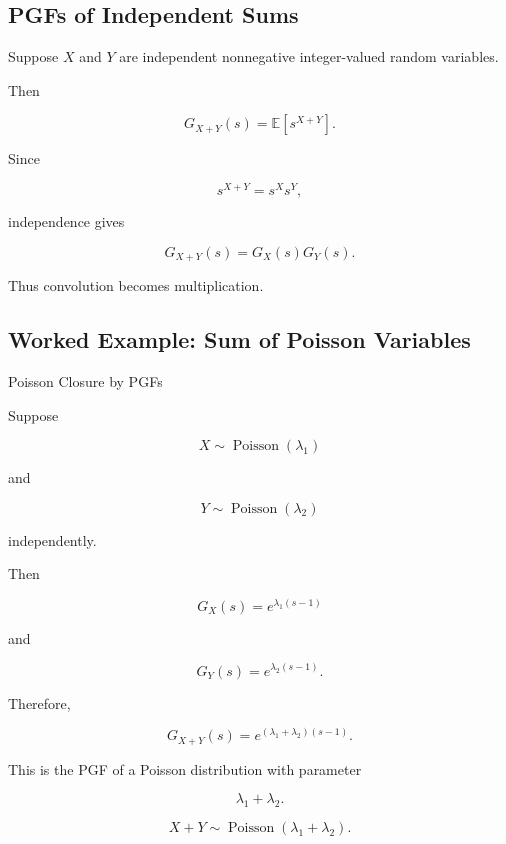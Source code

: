 \subsection{PGFs of Independent Sums}
\label{subsec:pgf-independent-sums}

Suppose \(X\) and \(Y\) are independent nonnegative integer-valued
random variables.

Then

\[
G_{X+Y}(s)
=
\mathbb{E}[s^{X+Y}].
\]

Since

\[
s^{X+Y}
=
s^Xs^Y,
\]

independence gives

\[
\boxed{
G_{X+Y}(s)
=
G_X(s)G_Y(s).
}
\]

Thus convolution becomes multiplication.

\subsection{Worked Example: Sum of Poisson Variables}
\label{subsec:worked-pgf-poisson-sum}

\begin{workedexamplebox}{Poisson Closure by PGFs}

Suppose

\[
X\sim\operatorname{Poisson}(\lambda_1)
\]

and

\[
Y\sim\operatorname{Poisson}(\lambda_2)
\]

independently.

Then

\[
G_X(s)
=
e^{\lambda_1(s-1)}
\]

and

\[
G_Y(s)
=
e^{\lambda_2(s-1)}.
\]

Therefore,

\[
G_{X+Y}(s)
=
e^{(\lambda_1+\lambda_2)(s-1)}.
\]

This is the PGF of a Poisson distribution with parameter

\[
\lambda_1+\lambda_2.
\]

\begin{answerbox}
\[
\boxed{
X+Y
\sim
\operatorname{Poisson}(\lambda_1+\lambda_2).
}
\]
\end{answerbox}

\end{workedexamplebox}

